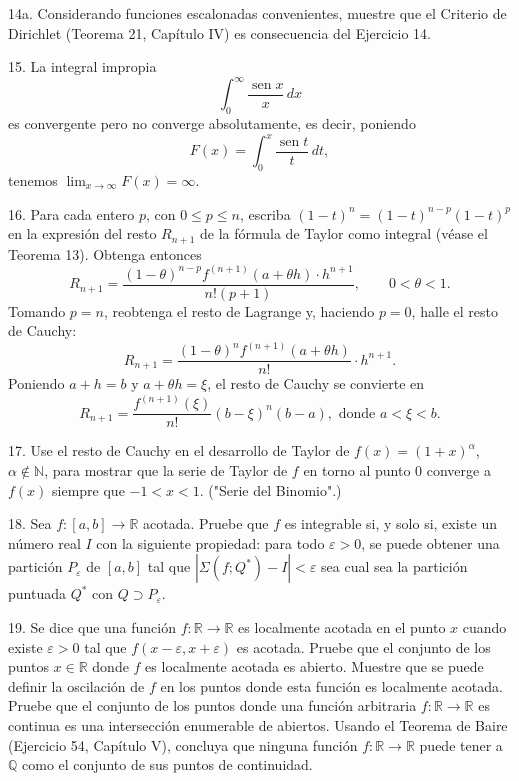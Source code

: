 \documentclass[12pt,oneside]{book}
\begin{document}
14a. Considerando funciones escalonadas convenientes, muestre que el Criterio de Dirichlet (Teorema 21, Capítulo IV) es consecuencia del Ejercicio 14.

15. La integral impropia
\[
\int_0^\infty \frac{\operatorname{sen} x}{x} \, dx
\]
es convergente pero no converge absolutamente, es decir, poniendo
\[
F(x) = \int_0^x \frac{\operatorname{sen} t}{t} \, dt,
\]
tenemos \(\lim_{x \to \infty} F(x) = \infty\).

16. Para cada entero \(p\), con \(0 \leq p \leq n\), escriba \((1 - t)^n = (1 - t)^{n-p}(1 - t)^p\) en la expresión del resto \(R_{n+1}\) de la fórmula de Taylor como integral (véase el Teorema 13). Obtenga entonces
\[
R_{n+1} = \frac{(1 - \theta)^{n-p} f^{(n+1)}(a + \theta h) \cdot h^{n+1}}{n! (p + 1)}, \qquad 0 < \theta < 1.
\]
Tomando \(p = n\), reobtenga el resto de Lagrange y, haciendo \(p = 0\), halle el resto de Cauchy:
\[
R_{n+1} = \frac{(1 - \theta)^n f^{(n+1)}(a + \theta h)}{n!} \cdot h^{n+1}.
\]
Poniendo \(a + h = b\) y \(a + \theta h = \xi\), el resto de Cauchy se convierte en
\[
R_{n+1} = \frac{f^{(n+1)}(\xi)}{n!} (b - \xi)^n (b - a), \text{ donde } a < \xi < b.
\]

17. Use el resto de Cauchy en el desarrollo de Taylor de \(f(x) = (1 + x)^\alpha\), \(\alpha \notin \mathbb{N}\), para mostrar que la serie de Taylor de \(f\) en torno al punto 0 converge a \(f(x)\) siempre que \(-1 < x < 1\). ("Serie del Binomio".)

18. Sea \(f: [a, b] \to \mathbb{R}\) acotada. Pruebe que \(f\) es integrable si, y solo si, existe un número real \(I\) con la siguiente propiedad: para todo \(\varepsilon > 0\), se puede obtener una partición \(P_\varepsilon\) de \([a, b]\) tal que \(|\Sigma(f; Q^*) - I| < \varepsilon\) sea cual sea la partición puntuada \(Q^*\) con \(Q \supset P_\varepsilon\).

19. Se dice que una función \(f: \mathbb{R} \to \mathbb{R}\) es localmente acotada en el punto \(x\) cuando existe \(\varepsilon > 0\) tal que \(f(x - \varepsilon, x + \varepsilon)\) es acotada. Pruebe que el conjunto de los puntos \(x \in \mathbb{R}\) donde \(f\) es localmente acotada es abierto. Muestre que se puede definir la oscilación de \(f\) en los puntos donde esta función es localmente acotada. Pruebe que el conjunto de los puntos donde una función arbitraria \(f: \mathbb{R} \to \mathbb{R}\) es continua es una intersección enumerable de abiertos. Usando el Teorema de Baire (Ejercicio 54, Capítulo V), concluya que ninguna función \(f: \mathbb{R} \to \mathbb{R}\) puede tener a \(\mathbb{Q}\) como el conjunto de sus puntos de continuidad.
\end{document}
